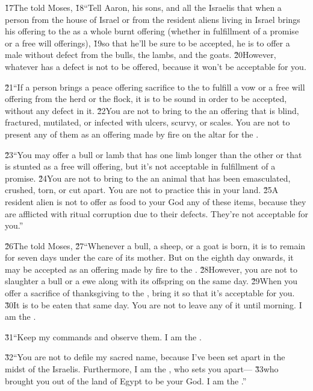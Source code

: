 \v{17}The  told Moses, \v{18}``Tell Aaron, his sons, and all the Israelis that when a person from the house of Israel or from the resident aliens living in Israel brings his offering to the  as a whole burnt offering (whether in fulfillment of a promise or a free will offerings), \v{19}so that he'll be sure to be accepted, he is to offer a male without defect from the bulls, the lambs, and the goats. \v{20}However, whatever has a defect is not to be offered, because it won't be acceptable for you.

\v{21}``If a person brings a peace offering sacrifice to the  to fulfill a vow or a free will offering from the herd or the flock, it is to be sound in order to be accepted, without any defect in it. \v{22}You are not to bring to the  an offering that is blind, fractured, mutilated, or infected with ulcers, scurvy, or scales. You are not to present any of them as an offering made by fire on the altar for the .

\v{23}``You may offer a bull or lamb that has one limb longer than the other or that is stunted as a free will offering, but it's not acceptable in fulfillment of a promise. \v{24}You are not to bring to the  an animal that has been emasculated, crushed, torn, or cut apart. You are not to practice this in your land. \v{25}A resident alien is not to offer as food to your God any of these items, because they are afflicted with ritual corruption due to their defects. They're not acceptable for you.''

\v{26}The  told Moses, \v{27}``Whenever a bull, a sheep, or a goat is born, it is to remain for seven days under the care of its mother. But on the eighth day onwards, it may be accepted as an offering made by fire to the . \v{28}However, you are not to slaughter a bull or a ewe along with its offspring on the same day. \v{29}When you offer a sacrifice of thanksgiving to the , bring it so that it's acceptable for you. \v{30}It is to be eaten that same day. You are not to leave any of it until morning. I am the .

\v{31}``Keep my commands and observe them. I am the .

\v{32}``You are not to defile my sacred name, because I've been set apart in the midst of the Israelis. Furthermore, I am the , who sets you apart--- \v{33}who brought you out of the land of Egypt to be your God. I am the .''


